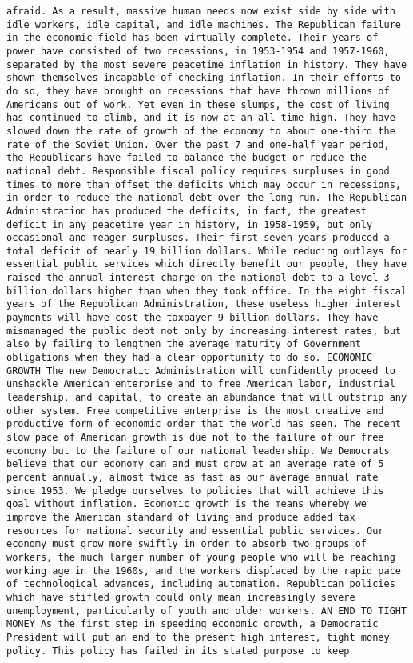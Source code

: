 \documentclass[
]{article}
\begin{document}
\begin{verbatim}
afraid. As a result, massive human needs now exist side by side with idle workers, idle capital, and idle machines. The Republican failure in the economic field has been virtually complete. Their years of power have consisted of two recessions, in 1953-1954 and 1957-1960, separated by the most severe peacetime inflation in history. They have shown themselves incapable of checking inflation. In their efforts to do so, they have brought on recessions that have thrown millions of Americans out of work. Yet even in these slumps, the cost of living has continued to climb, and it is now at an all-time high. They have slowed down the rate of growth of the economy to about one-third the rate of the Soviet Union. Over the past 7 and one-half year period, the Republicans have failed to balance the budget or reduce the national debt. Responsible fiscal policy requires surpluses in good times to more than offset the deficits which may occur in recessions, in order to reduce the national debt over the long run. The Republican Administration has produced the deficits, in fact, the greatest deficit in any peacetime year in history, in 1958-1959, but only occasional and meager surpluses. Their first seven years produced a total deficit of nearly 19 billion dollars. While reducing outlays for essential public services which directly benefit our people, they have raised the annual interest charge on the national debt to a level 3 billion dollars higher than when they took office. In the eight fiscal years of the Republican Administration, these useless higher interest payments will have cost the taxpayer 9 billion dollars. They have mismanaged the public debt not only by increasing interest rates, but also by failing to lengthen the average maturity of Government obligations when they had a clear opportunity to do so. ECONOMIC GROWTH The new Democratic Administration will confidently proceed to unshackle American enterprise and to free American labor, industrial leadership, and capital, to create an abundance that will outstrip any other system. Free competitive enterprise is the most creative and productive form of economic order that the world has seen. The recent slow pace of American growth is due not to the failure of our free economy but to the failure of our national leadership. We Democrats believe that our economy can and must grow at an average rate of 5 percent annually, almost twice as fast as our average annual rate since 1953. We pledge ourselves to policies that will achieve this goal without inflation. Economic growth is the means whereby we improve the American standard of living and produce added tax resources for national security and essential public services. Our economy must grow more swiftly in order to absorb two groups of workers, the much larger number of young people who will be reaching working age in the 1960s, and the workers displaced by the rapid pace of technological advances, including automation. Republican policies which have stifled growth could only mean increasingly severe unemployment, particularly of youth and older workers. AN END TO TIGHT MONEY As the first step in speeding economic growth, a Democratic President will put an end to the present high interest, tight money policy. This policy has failed in its stated purpose to keep 
\end{verbatim}
\end{document}
